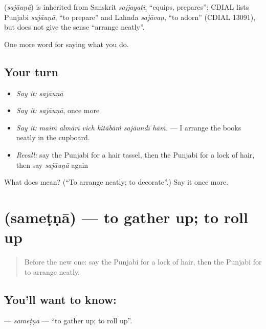 \begin{cousinweb}
\textbf{} (\emph{sajāuṇā}) is inherited from Sanskrit \emph{sajjayati}, \textquotedblleft{}equips, prepares\textquotedblright{}; CDIAL lists Punjabi \emph{sajāuṇā}, \textquotedblleft{}to prepare\textquotedblright{} and Lahnda \emph{sajāvaṇ}, \textquotedblleft{}to adorn\textquotedblright{} (CDIAL 13091), but does not give the sense \textquotedblleft{}arrange neatly\textquotedblright{}.
\end{cousinweb}

\begin{grammarlens}[title={What you've built}]
One more word for saying what you do.
\end{grammarlens}

\subsection*{Your turn}
\begin{itemize}
\raggedright
  \item \emph{Say it:} \emph{sajāuṇā}
  \item \emph{Say it:} \emph{sajāuṇā}, once more
  \item \emph{Say it:} \emph{maiṁ almārī vich kitābāṁ sajāundī hāṁ.} — I arrange the books neatly in the cupboard.
  \item \emph{Recall:} say the Punjabi for a hair tassel, then the Punjabi for a lock of hair, then say \emph{sajāuṇā} again
\end{itemize}

\begin{tcolorbox}[breakable,colback=teal!4,colframe=teal!35!black,title={Before you move on}]
What does  mean? (\textquotedblleft{}To arrange neatly; to decorate\textquotedblright{}.) Say it once more.
\end{tcolorbox}
\section[\texorpdfstring{\pa{ਸਮੇਟਣਾ} (sameṭṇā)}{ਸਮੇਟਣਾ (sameṭṇā)}]{ (sameṭṇā) — to gather up; to roll up}

\label{lesson:PA-C232-sametna}



\begin{quote}
Before the new one: say the Punjabi for a lock of hair, then the Punjabi for to arrange neatly.
\end{quote}

\subsection*{You'll want to know: }
\textbf{} — \emph{sameṭṇā} — \textquotedblleft{}to gather up; to roll up\textquotedblright{}.

